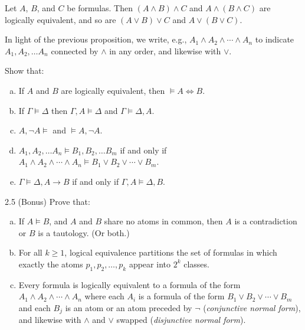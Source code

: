 \documentclass{article}
\begin{document}
\begin{proposition}
    Let $A$, $B$, and $C$ be formulas. Then $(A \wedge B) \wedge C$ and $A \wedge (B \wedge C)$ are logically equivalent, and so are $(A \vee B) \vee C$ and $A \vee (B \vee C)$.
\end{proposition}

\begin{notation}
    In light of the previous proposition, we write, e.g., $A_1 \wedge A_2 \wedge \cdots \wedge A_n$ to indicate $A_1, A_2, \dots A_n$ connected by $\wedge$ in any order, and likewise with $\vee$. 
\end{notation}

\begin{prob}{2.4}
    Show that:
    \begin{enumerate}[a)]
    \item If $A$ and $B$ are logically equivalent, then $\models A \iff B$.
    \item If $\Gamma \models \Delta$ then $\Gamma, A \models \Delta$ and $\Gamma \models \Delta, A$.
    \item $A, \neg A \models$ and $\models A, \neg A$.
    \item $A_1, A_2, \dots A_n \models B_1, B_2, \dots B_m$ if and only if $A_1 \wedge A_2 \wedge \cdots \wedge A_n \models B_1 \vee B_2 \vee \cdots \vee B_m$.
    \item $\Gamma \models \Delta, A \to B$ if and only if $\Gamma, A \models \Delta, B$.
    \end{enumerate}
\end{prob}

\begin{prob}{2.5 (Bonus)}
    Prove that:
    \begin{enumerate}[a)]
    \item If $A \models B$, and $A$ and $B$ share no atoms in common, then $A$ is a contradiction or $B$ is a tautology. (Or both.)
    \item For all $k \geq 1$, logical equivalence partitions the set of formulas in which exactly the atoms $p_1, p_2, \dots, p_k$ appear into $2^k$ classes.
    \item Every formula is logically equivalent to a formula of the form $A_1 \wedge A_2 \wedge \cdots \wedge A_n$ where each $A_i$ is a formula of the form $B_1 \vee B_2 \vee \cdots \vee B_m$ and each $B_j$ is an atom or an atom preceded by $\neg$ (\emph{conjunctive normal form}), and likewise with $\wedge$ and $\vee$ swapped (\emph{disjunctive normal form}).
    \end{enumerate}
\end{prob}
\end{document}
